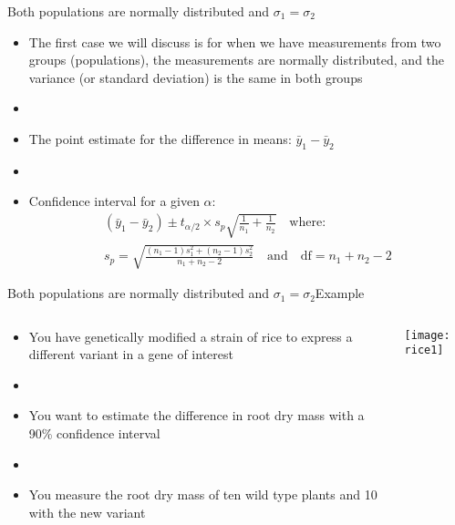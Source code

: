 \documentclass[xcolor=dvipsnames]{beamer}
\begin{document}
\begin{frame}{Both populations are normally distributed and $\sigma_1 = \sigma_2$}
	\begin{itemize}
		\item The first case we will discuss is for when we have measurements from two groups (populations), the measurements are normally distributed, and the variance (or standard deviation) is the same in both groups \pause
		\item[]
		\item The point estimate for the difference in means: $\bar{y}_1 - \bar{y}_2$ \pause
		\item[]
		\item Confidence interval for a given $\alpha$: \pause
		\begin{gather*}
			(\bar{y}_1 - \bar{y}_2) \pm t_{\alpha /2} \times s_p \sqrt{\frac{1}{n_1} + \frac{1}{n_2}} \quad \text{where:} \\
			s_p = \sqrt{\frac{(n_1 -1)s_1^2 + (n_2-1)s_2^2}{n_1 + n_2 -2}} \quad \text{and} \quad \text{df} = n_1 + n_2 -2
		\end{gather*}
	\end{itemize}
\end{frame}

\begin{frame}{Both populations are normally distributed and $\sigma_1 = \sigma_2$}{Example}
\begin{columns}
	\begin{column}{.5 \textwidth}
		\begin{itemize}
			\item You have genetically modified a strain of rice to express a different variant in a gene of interest \pause
			\item[]
			\item You want to estimate the difference in root dry mass with a 90\% confidence interval \pause
			\item[]
			\item You measure the root dry mass of ten wild type plants and 10 with the new variant
		\end{itemize}
	\end{column}
	\begin{column}{.5 \textwidth}
		\begin{center}
			\texttt{[image: rice1]}
		\end{center}
	\end{column}
\end{columns}
\end{frame}
\end{document}
